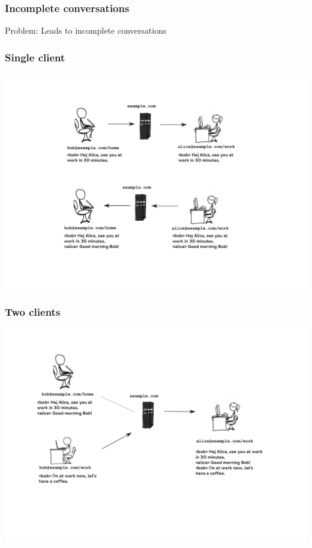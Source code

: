 \documentclass[notes=hide,yellow]{beamer}
\begin{document}
	\begin{frame}
		\frametitle{Incomplete conversations}
		\begin{block}{Problem:}
		Leads to incomplete conversations\\
		\end{block}
	\end{frame}
	
	\begin{frame}
		\frametitle{Single client}
		\includegraphics[scale=0.4]{../img/conversation1.pdf}
	\end{frame}
	
	\begin{frame}
		\frametitle{Two clients}
		\includegraphics[scale=0.4]{../img/conversation2.pdf}
	\end{frame}
	
\end{document}
